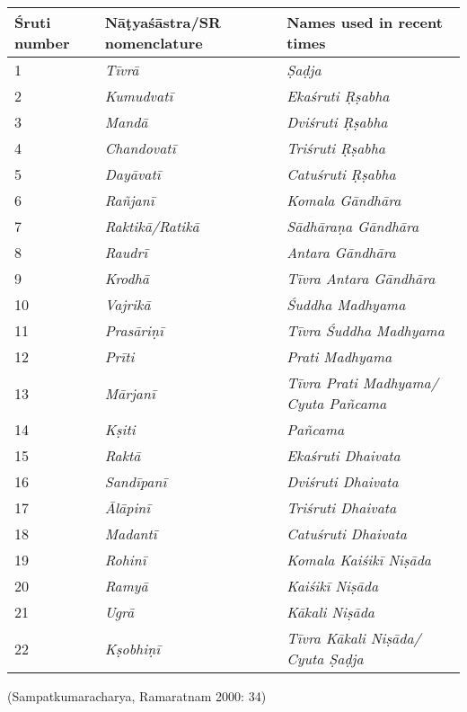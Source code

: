 \begin{longtable}{|p{1.3cm}|p{3cm}|p{4cm}|}
\hline
\textbf{Śruti number} & \textbf{Nāṭyaśāstra/SR nomenclature} & \textbf{Names used in recent times} \\
\hline
1 & \textit{Tīvrā} & \textit{Ṣaḍja} \\
\hline
2 & \textit{Kumudvatī} & \textit{Ekaśruti Ṛṣabha} \\
\hline
3 & \textit{Mandā} & \textit{Dviśruti Ṛṣabha} \\
\hline
4 & \textit{Chandovatī} & \textit{Triśruti Ṛṣabha} \\
\hline
5 & \textit{Dayāvatī} & \textit{Catuśruti Ṛṣabha} \\
\hline
6 & \textit{Rañjanī} & \textit{Komala Gāndhāra} \\
\hline
7 & \textit{Raktikā/Ratikā} & \textit{Sādhāraṇa Gāndhāra} \\
\hline
8 & \textit{Raudrī} & \textit{Antara Gāndhāra} \\
\hline
9 & \textit{Krodhā} & \textit{Tīvra Antara Gāndhāra} \\
\hline
10 & \textit{Vajrikā} & \textit{Śuddha Madhyama} \\
\hline
11 & \textit{Prasāriṇī} & \textit{Tīvra Śuddha Madhyama} \\
\hline
12 & \textit{Prīti} & \textit{Prati Madhyama} \\
\hline
13 & \textit{Mārjanī} & \textit{Tīvra Prati Madhyama/ Cyuta Pañcama} \\
\hline
14 & \textit{Kṣiti} & \textit{Pañcama} \\
\hline
15 & \textit{Raktā} & \textit{Ekaśruti Dhaivata} \\
\hline
16 & \textit{Sandīpanī} & \textit{Dviśruti Dhaivata} \\
\hline
17 & \textit{Ālāpinī} & \textit{Triśruti Dhaivata} \\
\hline
18 & \textit{Madantī} & \textit{Catuśruti Dhaivata} \\
\hline
19 & \textit{Rohinī} & \textit{Komala Kaiśikī Niṣāda} \\
\hline
20 & \textit{Ramyā} & \textit{Kaiśikī Niṣāda} \\
\hline
21 & \textit{Ugrā} & \textit{Kākali Niṣāda} \\
\hline
22 & \textit{Kṣobhiṇī} & \textit{Tīvra Kākali Niṣāda/ Cyuta Ṣaḍja} \\
\hline
\end{longtable}

\begin{flushright}
(Sampatkumaracharya, Ramaratnam 2000: 34)
\end{flushright}

